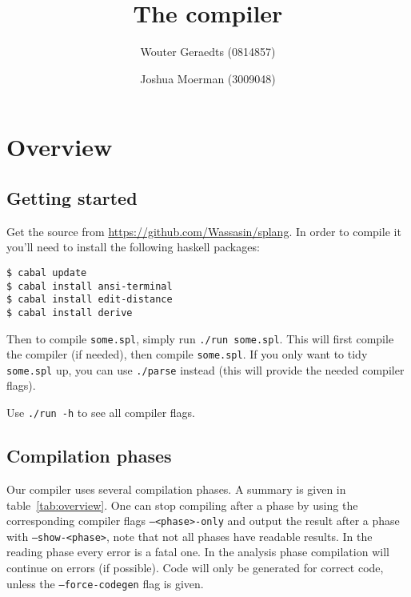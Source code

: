 \documentclass[14pt]{amsart}
\title{The \splang compiler}
\author{Wouter Geraedts (0814857) \and Joshua Moerman (3009048)}
\date{}
\newcommand{\flag}[1]{\texttt{#1}}
\begin{document}
\maketitle

\tableofcontents

\section{Overview}
\subsection{Getting started}
Get the source from \url{https://github.com/Wassasin/splang}. In order to compile it you'll need to install the following haskell packages:
\begin{lstlisting}
$ cabal update
$ cabal install ansi-terminal
$ cabal install edit-distance
$ cabal install derive
\end{lstlisting}

Then to compile \texttt{some.spl}, simply run \texttt{./run some.spl}. This will first compile the compiler (if needed), then compile \texttt{some.spl}. If you only want to tidy \texttt{some.spl} up, you can use \texttt{./parse} instead (this will provide the needed compiler flags).

Use \texttt{./run -h} to see all compiler flags.

\subsection{Compilation phases}
Our compiler uses several compilation phases. A summary is given in table~\ref{tab:overview}. One can stop compiling after a phase by using the corresponding compiler flags \flag{--<phase>-only} and output the result after a phase with \flag{--show-<phase>}, note that not all phases have readable results. In the reading phase every error is a fatal one. In the analysis phase compilation will continue on errors (if possible). Code will only be generated for correct code, unless the \flag{--force-codegen} flag is given.
\end{document}
